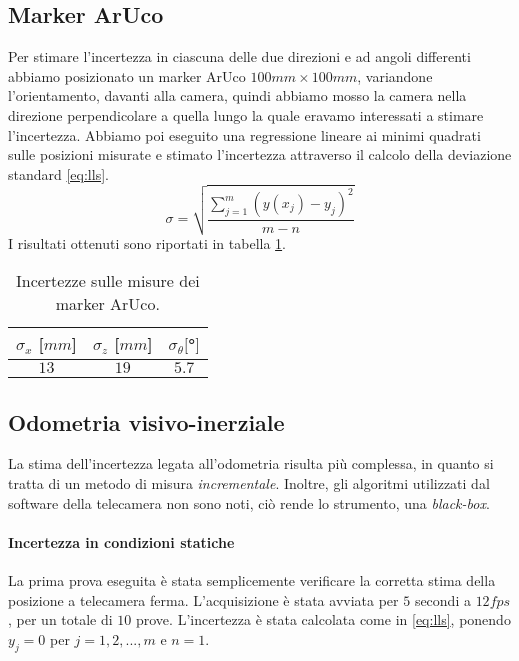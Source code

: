 \documentclass[
	a4paper, %
	10pt, %
]{LTJournalArticle}
\begin{document}
\subsection{Marker ArUco}

Per stimare l'incertezza in ciascuna delle due direzioni e ad angoli differenti abbiamo posizionato un marker ArUco $100mm\times100mm$, variandone l'orientamento, davanti alla camera, quindi abbiamo mosso la camera nella direzione perpendicolare a quella lungo la quale eravamo interessati a stimare l'incertezza. Abbiamo poi eseguito una regressione lineare ai minimi quadrati sulle posizioni misurate e stimato l'incertezza attraverso il calcolo della deviazione standard \ref{eq:lls}.
\begin{equation}
    \sigma = \sqrt{\frac{\sum_{j=1}^{m}(y(x_{j})-y_{j})^{2}}{m-n}}
    \label{eq:lls}
\end{equation}
\vspace{-8pt}
I risultati ottenuti sono riportati in tabella \ref{tab:uaruco}.
\begin{table}[h]
    \centering
    \begin{tabular}{|c|c|c|}
    \hline
        $\sigma_x$ [$mm$]& $\sigma_z$ [$mm$]  & $\sigma_{\theta} [$°$]$ \\
        \hline
        $13$& $19$ & $5.7$ \\
    \hline
    \end{tabular}
    \caption{Incertezze sulle misure dei marker ArUco.}
    \label{tab:uaruco}
\end{table}
\vspace{-12pt}
\subsection{Odometria visivo-inerziale}

La stima dell'incertezza legata all'odometria risulta più complessa, in quanto si tratta di un metodo di misura \emph{incrementale}. Inoltre, gli algoritmi utilizzati dal software della telecamera non sono noti, ciò rende lo strumento, una \emph{black-box}.
\vspace{-18pt}
\paragraph{Incertezza in condizioni statiche} La prima prova eseguita è stata semplicemente verificare la corretta stima della posizione a telecamera ferma. L'acquisizione è stata avviata per $5$ secondi a $12 fps$, per un totale di $10$ prove. L'incertezza è stata calcolata come in \ref{eq:lls}, ponendo $y_{j}=0$ per $j=1,2,...,m$ e
$n=1$.
\vspace{-12pt}
\end{document}
